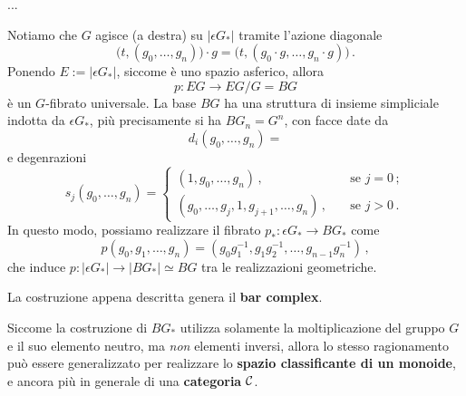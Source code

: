 ...

Notiamo che $G$ agisce (a destra) su $|\epsilon G_{*}|$ tramite l'azione diagonale
\begin{equation*}
	\Big( t, (g_{0}, \dots, g_{n})\Big) \cdot g = \Big( t, (g_{0}\cdot g, \dots, g_{n}\cdot g)\Big)\,.
\end{equation*}
Ponendo $E := |\epsilon G_{*}|$, siccome è uno spazio asferico, allora
\begin{equation*}
	p : EG \longrightarrow EG/G = BG
\end{equation*}
è un $G$-fibrato universale. 
La base $BG$ ha una struttura di insieme simpliciale indotta da $\epsilon G_{*}$, 
più precisamente si ha $BG_{n} = G^{n}$,
con facce date da
\begin{equation*}
	d_{i}(g_{0}, \dots, g_{n}) =
\end{equation*}
e degenrazioni 
\begin{equation*}
	s_{j}(g_{0}, \dots, g_{n}) =
	\begin{cases}
		(1,g_{0}, \dots, g_{n})\,, \quad &\text{se } j=0\,;\\
		(g_{0}, \dots, g_{j}, 1, g_{j+1}, \dots, g_{n})\,, \quad &\text{se } j>0\,.
	\end{cases}
\end{equation*}
In questo modo, possiamo realizzare il fibrato $p_{*}: \epsilon G_{*} \to BG_{*}$
come
\begin{equation*}
	p(g_{0}, g_{1},\dots, g_{n}) = (g_{0} g_{1}^{-1}, g_{1}g_{2}^{-1},\dots, g_{n-1}g_{n}^{-1})\,,
\end{equation*}
che induce $p:| \epsilon G_{*} | \to |BG_{*}|\simeq BG$ tra le realizzazioni geometriche.

La costruzione appena descritta genera il \textbf{bar complex}.

\begin{oss}
Siccome la costruzione di $BG_{*}$ utilizza solamente la moltiplicazione del gruppo $G$
e il suo elemento neutro, ma \emph{non} elementi inversi, allora
lo stesso ragionamento può essere generalizzato per realizzare lo
\textbf{spazio classificante di un monoide}, e ancora più in generale di una \textbf{categoria} $\mathcal{C}$.
\end{oss}
